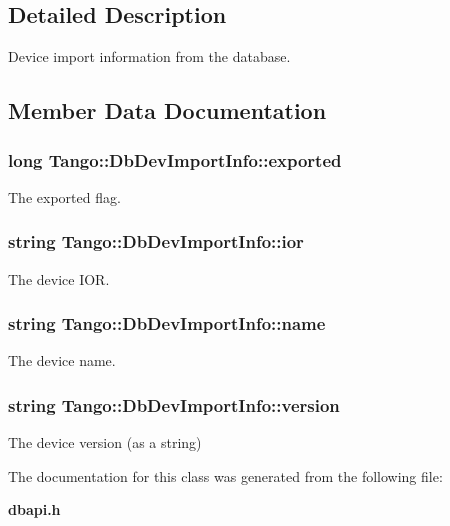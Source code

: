 \subsection{Detailed Description}
Device import information from the database. 

\subsection{Member Data Documentation}
\subsubsection[{exported}]{\setlength{\rightskip}{0pt plus 5cm}long Tango\-::\-Db\-Dev\-Import\-Info\-::exported}\label{classTango_1_1DbDevImportInfo_a2a799d0bf486fecb4df770af69c71bd9}


The exported flag. 

\subsubsection[{ior}]{\setlength{\rightskip}{0pt plus 5cm}string Tango\-::\-Db\-Dev\-Import\-Info\-::ior}\label{classTango_1_1DbDevImportInfo_a5d22c1daf5d2d97fcb5939db4224ca07}


The device I\-O\-R. 

\subsubsection[{name}]{\setlength{\rightskip}{0pt plus 5cm}string Tango\-::\-Db\-Dev\-Import\-Info\-::name}\label{classTango_1_1DbDevImportInfo_a885165239e268932e47bfd5a8cfdaaef}


The device name. 

\subsubsection[{version}]{\setlength{\rightskip}{0pt plus 5cm}string Tango\-::\-Db\-Dev\-Import\-Info\-::version}\label{classTango_1_1DbDevImportInfo_a29cc919c256c62429416b56137bb1161}


The device version (as a string) 



The documentation for this class was generated from the following file\-:\begin{DoxyCompactItemize}
\item 
{\bf dbapi.\-h}\end{DoxyCompactItemize}
